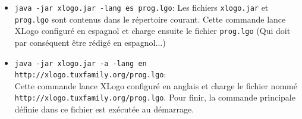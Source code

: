 \begin{itemize}
 \item \texttt{java -jar xlogo.jar -lang es prog.lgo}: Les fichiers \texttt{xlogo.jar} et \texttt{prog.lgo} sont contenus dans le répertoire courant. Cette commande lance XLogo configuré en espagnol et charge ensuite le fichier \texttt{prog.lgo} (Qui doit par conséquent être rédigé en espagnol...)\\
 \item \texttt{java -jar xlogo.jar -a -lang en http://xlogo.tuxfamily.org/prog.lgo}:\\
 Cette commande lance XLogo configuré en anglais et charge le fichier nommé \\ \texttt{http://xlogo.tuxfamily.org/prog.lgo}. Pour finir, la commande principale définie dans ce fichier est exécutée au démarrage.\\
\end{itemize}


